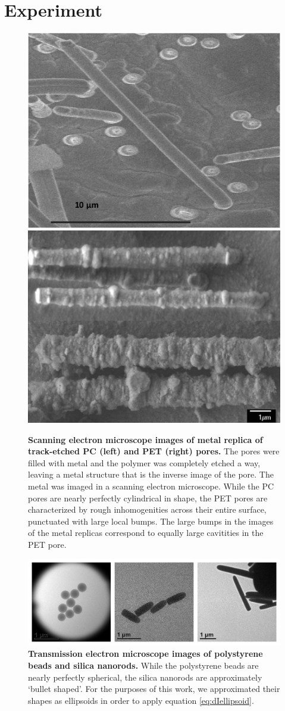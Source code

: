 	\section{Experiment}
	    
		\begin{figure}
			\hfill
			\includegraphics[height=0.35\textwidth]{PC}
			\hfill
			\includegraphics[height=0.35\textwidth]{PET}
			\hfill
			\caption{\textbf{Scanning electron microscope images of metal replica of track-etched PC (left) and PET (right) pores.} The pores were filled with metal and the polymer was completely etched a way, leaving a metal structure that is the inverse image of the pore. The metal was imaged in a scanning electron microscope. While the PC pores are nearly perfectly cylindrical in shape, the PET pores are characterized by rough inhomogenities across their entire surface, punctuated with large local bumps. The large bumps in the images of the metal replicas correspond to equally large cavitities in the PET pore.}
			\label{fig:PCPET}
		\end{figure}
		
		\begin{figure}
			\includegraphics[width=1\textwidth]{particles}
			\caption{\textbf{Transmission electron microscope images of polystyrene beads and silica nanorods.} While the polystyrene beads are nearly perfectly spherical, the silica nanorods are approximately `bullet shaped'. For the purposes of this work, we approximated their shapes as ellipsoids in order to apply equation \ref{eq:dIellipsoid}.}
			\label{fig:particles}
		\end{figure}
		
